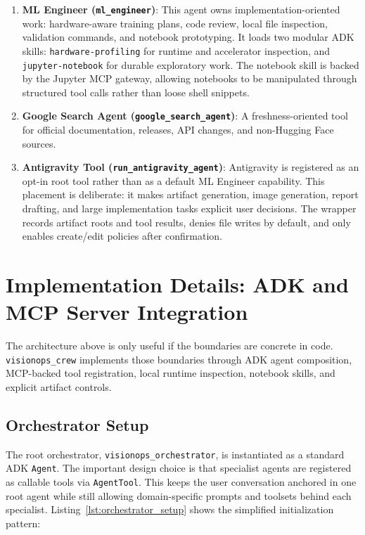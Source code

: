 \documentclass[11pt,a4paper]{article}
\begin{document}
\begin{enumerate}
    \item \textbf{ML Engineer (\texttt{ml\_engineer})}: 
    This agent owns implementation-oriented work: hardware-aware training plans, code review, local file inspection, validation commands, and notebook prototyping. It loads two modular ADK skills: \texttt{hardware-profiling} for runtime and accelerator inspection, and \texttt{jupyter-notebook} for durable exploratory work. The notebook skill is backed by the Jupyter MCP gateway, allowing notebooks to be manipulated through structured tool calls rather than loose shell snippets.

    \item \textbf{Google Search Agent (\texttt{google\_search\_agent})}: 
    A freshness-oriented tool for official documentation, releases, API changes, and non-Hugging Face sources.

    \item \textbf{Antigravity Tool (\texttt{run\_antigravity\_agent})}: 
    Antigravity is registered as an opt-in root tool rather than as a default ML Engineer capability. This placement is deliberate: it makes artifact generation, image generation, report drafting, and large implementation tasks explicit user decisions. The wrapper records artifact roots and tool results, denies file writes by default, and only enables create/edit policies after confirmation.
\end{enumerate}

\section{Implementation Details: ADK and MCP Server Integration}
The architecture above is only useful if the boundaries are concrete in code. \texttt{visionops\_crew} implements those boundaries through ADK agent composition, MCP-backed tool registration, local runtime inspection, notebook skills, and explicit artifact controls.

\subsection{Orchestrator Setup}
The root orchestrator, \texttt{visionops\_orchestrator}, is instantiated as a standard ADK \texttt{Agent}. The important design choice is that specialist agents are registered as callable tools via \texttt{AgentTool}. This keeps the user conversation anchored in one root agent while still allowing domain-specific prompts and toolsets behind each specialist. Listing~\ref{lst:orchestrator_setup} shows the simplified initialization pattern:
\end{document}
